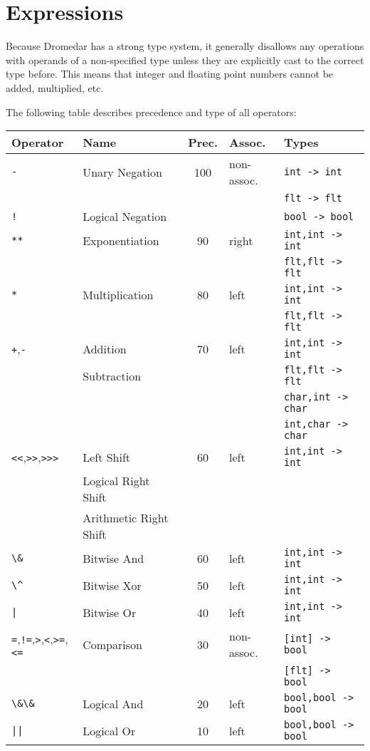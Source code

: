 \documentclass{article}
\newcommand{\code}[1]{\lstinline[columns=fixed]{#1}}
\begin{document}
	\section{Expressions}
	
		Because Dromedar has a strong type system, it generally disallows any operations with operands of a non-specified type unless they are explicitly cast to the correct type before. This means that integer and floating point numbers cannot be added, multiplied, etc.
		
		The following table describes precedence and type of all operators:\\
		
		\begin{tabular}{l|l|c|l|l}
			\textbf{Operator} & \textbf{Name} & \textbf{Prec.} & \textbf{Assoc.} & \textbf{Types}\\
			\midrule
			\code{-} & Unary Negation & 100 & non-assoc. & \code{int -> int}\\
				&&&& \code{flt -> flt}\\
			\code{!} & Logical Negation &&& \code{bool -> bool}\\
			\midrule
			\code{**} & Exponentiation & 90 & right & \code{int,int -> int}\\
				&&&& \code{flt,flt -> flt}\\
			\midrule
			\code{*} & Multiplication & 80 & left & \code{int,int -> int}\\
				&&&& \code{flt,flt -> flt}\\
			\midrule
			\code{+},\code{-} & Addition & 70 & left & \code{int,int -> int}\\
				& Subtraction &&& \code{flt,flt -> flt}\\
				&&&& \code{char,int -> char}\\
				&&&& \code{int,char -> char}\\
			\midrule
			\code{<<},\code{>>},\code{>>>} & Left Shift & 60 & left & \code{int,int -> int}\\
			& Logical Right Shift &&& \\
			& Arithmetic Right Shift &&& \\
			\midrule
			\code{\&} & Bitwise And & 60 & left & \code{int,int -> int}\\
			\midrule
			\code{\^} & Bitwise Xor & 50 & left & \code{int,int -> int}\\
			\midrule
			\code{|} & Bitwise Or & 40 & left & \code{int,int -> int}\\
			\midrule
			\code{=},\code{!=},\code{>},\code{<},\code{>=},\code{<=} & Comparison & 30 & non-assoc. & \code{[int] -> bool} \\
				&&&& \code{[flt] -> bool}\\
			\midrule
			\code{\&\&} & Logical And & 20 & left & \code{bool,bool -> bool}\\
			\midrule
			\code{||} & Logical Or & 10 & left & \code{bool,bool -> bool}
		\end{tabular}\\
	
\end{document}
